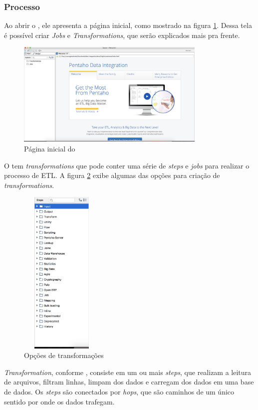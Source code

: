 \subsubsection{Processo}
Ao abrir o \pdi, ele apresenta a página inicial, como mostrado na figura \ref{initialpdi}. Dessa tela é possível criar \textit{Jobs} e \textit{Transformations}, que serão explicados mais pra frente. 
\begin{figure}[H]
\centering
\includegraphics[height=5cm]{imagens/pagina_principal_pentaho.png}
\caption{Página inicial do \pdi}
\label{initialpdi}
\end{figure}
O \pdi tem \textit{transformations} que pode conter uma série de \textit{steps} e \textit{jobs} para realizar o processo de ETL. A figura \ref{transformationOptions} exibe algumas das opções para criação de \textit{transformations}.
\begin{figure}[H]
\centering
\includegraphics[width=4cm, height=8cm]{imagens/opcoes_de_transformacao.png}
\caption{Opções de transformações}
\label{transformationOptions}

\end{figure}
\textit{Transformation}, conforme , consiste em um ou mais \textit{steps}, que realizam a leitura de arquivos, filtram linhas, limpam dos dados e carregam dos dados em uma base de dados. Os \textit{steps} são conectados por \textit{hops}, que são caminhos de um único sentido por onde os dados trafegam. 

